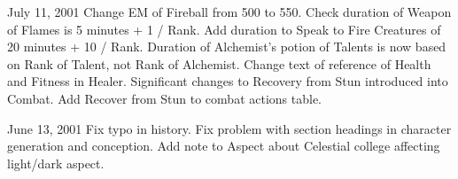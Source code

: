 \begin{edition}{1.4}
\item[July 11, 2001] Change EM of Fireball from 500 to 550.  Check
duration of Weapon of Flames is 5 minutes + 1 / Rank.  Add duration to
Speak to Fire Creatures of 20 minutes + 10 / Rank.  Duration of
Alchemist's potion of Talents is now based on Rank of Talent, not Rank
of Alchemist. Change text of reference of Health and Fitness in
Healer.  Significant changes to Recovery from Stun introduced into
Combat.  Add Recover from Stun to combat actions table.

\item[June 13, 2001] Fix typo in history.  Fix problem with section
headings in character generation and conception.  Add note to Aspect
about Celestial college affecting light/dark aspect.

\end{edition}

